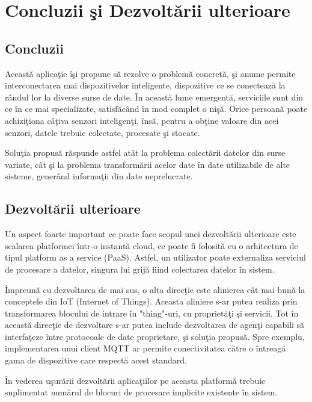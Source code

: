 \chapter{Concluzii şi Dezvoltării ulterioare}
\label{chapter:concluzii}
\section{Concluzii}

Această aplicaţie îşi propune să rezolve o problemă concretă, şi anume permite interconectarea mai dispozitivelor inteligente, dispozitive ce se conectează la rândul lor la diverse surse de date. În această lume emergentă, serviciile sunt din ce în ce mai specializate, satisfăcând în mod complet o nişă. Orice persoană poate achiziţiona câţiva senzori inteligenţi, însă, pentru a obţine valoare din acei senzori, datele trebuie colectate, procesate şi stocate. 

Soluţia propusă răspunde astfel atât la problema colectării datelor din surse variate, cât şi la problema transformării acelor date în date utilizabile de alte sisteme, generând informaţii din date neprelucrate.

\section{Dezvoltării ulterioare}

Un aspect foarte important ce poate face scopul unei dezvoltării ulterioare este scalarea platformei într-o instantă cloud, ce poate fi folosită cu o arhitectura de tipul platform as a service (PaaS). Astfel, un utilizator poate externaliza serviciul de procesare a datelor, singura lui grijă fiind colectarea datelor în sistem.

Împreună cu dezvoltarea de mai sus, o alta direcţie este alinierea cât mai bună la conceptele din IoT (Internet of Things). Aceasta aliniere s-ar putea realiza prin transformarea blocului de intrare în "thing"-uri, cu proprietăţi şi servicii. Tot în această direcţie de dezvoltare s-ar putea include dezvoltarea de agenţi capabili să interfaţeze între protocoale de date proprietare, şi soluţia propusă. Spre exemplu, implementarea unui client MQTT ar permite conectivitatea către o întreagă gama de dispozitive care respectă acest standard.

În vederea uşurării dezvoltării aplicaţiilor pe aceasta platformă trebuie suplimentat numărul de blocuri de procesare implicite existente în sistem.
